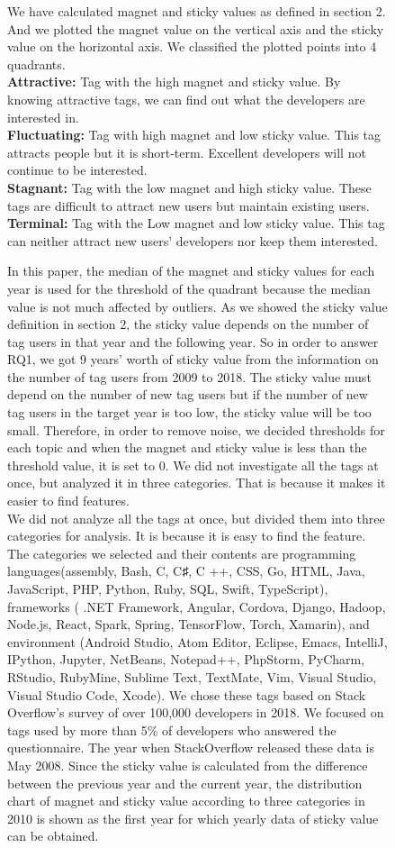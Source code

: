 \documentclass[conference]{IEEEtran}
\begin{document}
\begin{figure}[t]
We have calculated magnet and sticky values as defined in section 2. And we plotted the magnet value on the vertical axis and the sticky value on the horizontal axis. We classified the plotted points into 4 quadrants.\\
\textbf
{Attractive:} Tag with the high magnet and sticky value. By knowing attractive tags, we can find out what the developers are interested in.\\
\textbf{Fluctuating:} Tag with high magnet and low sticky value. This tag attracts people but it is short-term. Excellent developers will not continue to be interested.\\
\textbf{Stagnant:} Tag with the low magnet and high sticky value. These tags are difficult to attract new users but maintain existing users.\\
\textbf{Terminal:} Tag with the Low magnet and low sticky value. This tag can neither attract new users' developers nor keep them interested.
\smallskip
\smallskip

In this paper, the median of the magnet and sticky values for each year is used for the threshold of the quadrant because the median value is not much affected by outliers. As we showed the sticky value definition in section 2, the sticky value depends on the number of tag users in that year and the following year. So in order to answer RQ1, we got 9 years' worth of sticky value from the information on the number of tag users from 2009 to 2018. The sticky value must depend on the number of new tag users but if the number of new tag users in the target year is too low, the sticky value will be too small. Therefore, in order to remove noise, we decided thresholds for each topic and when the magnet and sticky value is less than the threshold value, it is set to 0.
We did not investigate all the tags at once, but analyzed it in three categories. That is because it makes it easier to find features.\\

We did not analyze all the tags at once, but divided them into three categories for analysis. It is because it is easy to find the feature. The categories we selected and their contents are programming languages ​​(assembly, Bash, C, C♯, C ++, CSS, Go, HTML, Java, JavaScript, PHP, Python, Ruby, SQL, Swift, TypeScript), frameworks ( .NET Framework, Angular, Cordova, Django, Hadoop, Node.js, React, Spark, Spring, TensorFlow, Torch, Xamarin), and environment (Android Studio, Atom Editor, Eclipse, Emacs, IntelliJ, IPython, Jupyter, NetBeans, Notepad++, PhpStorm, PyCharm, RStudio, RubyMine, Sublime Text, TextMate, Vim, Visual Studio, Visual Studio Code, Xcode).
We chose these tags based on Stack Overflow's survey of over 100,000 developers in 2018. We focused on tags used by more than 5\% of developers who answered the questionnaire. The year when StackOverflow released these data is May 2008. Since the sticky value is calculated from the difference between the previous year and the current year, the distribution chart of magnet and sticky value according to three categories in 2010 is shown as the first year for which yearly data of sticky value can be obtained.


\end{figure}
\end{document}

